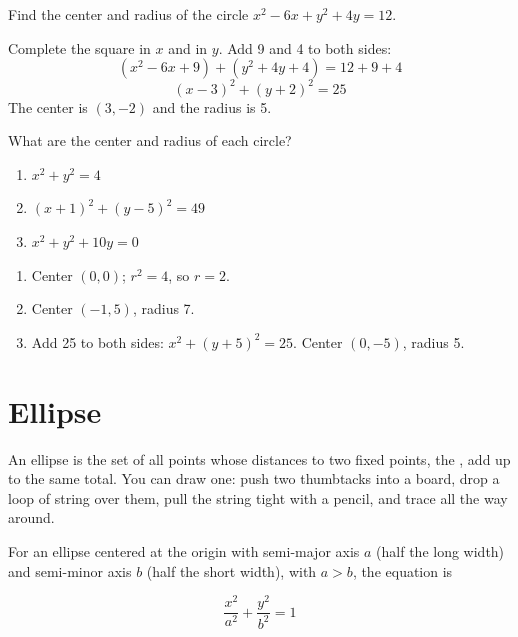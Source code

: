 \begin{Worked}
\begin{Problem}
Find the center and radius of the circle
$x^2 - 6x + y^2 + 4y = 12$.
\end{Problem}
\begin{Solution}
Complete the square in $x$ and in $y$. Add 9 and 4 to
both sides:
$$(x^2 - 6x + 9) + (y^2 + 4y + 4) = 12 + 9 + 4$$
$$(x - 3)^2 + (y + 2)^2 = 25$$
The center is $(3, -2)$ and the radius is 5.
\end{Solution}
\end{Worked}

\begin{Exercise}[title={Radius of a Circle}, label=conic1]
What are the center and radius of each circle?
\begin{enumerate}
\item $x^2 + y^2 = 4$
\item $(x + 1)^2 + (y - 5)^2 = 49$
\item $x^2 + y^2 + 10y = 0$
\end{enumerate}
\end{Exercise}
\begin{Answer}[ref=conic1]
\begin{enumerate}
\item Center $(0, 0)$; $r^2 = 4$, so $r = 2$.
\item Center $(-1, 5)$, radius 7.
\item Add 25 to both sides: $x^2 + (y + 5)^2 = 25$. Center $(0, -5)$,
      radius 5.
\end{enumerate}
\end{Answer}

\section{Ellipse}

An ellipse is the set of all points whose distances to two
fixed points, the , add up to the same total.
You can draw one: push two thumbtacks into a board, drop a loop of string
over them, pull the string tight with a pencil, and trace all the way
around.

For an ellipse centered at the origin with semi-major axis $a$ (half the
long width) and semi-minor axis $b$ (half the short width), with $a > b$,
the equation is

\begin{equation}
\frac{x^2}{a^2} + \frac{y^2}{b^2} = 1
\end{equation}

